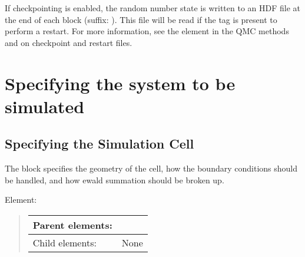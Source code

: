 \documentclass[letterpaper,10pt,english]{sphinxmanual}
\begin{document}
If checkpointing is enabled, the random number state is written to an HDF file at the end of each block (suffix: ).
This file will be read if the  tag is present to perform a restart.
For more information, see the  element in the QMC methods {\hyperref[\detokenize{methods:qmcmethods}]{}} and  on checkpoint and restart files.


\chapter{Specifying the system to be simulated}
\label{\detokenize{simulationcell:specifying-the-system-to-be-simulated}}\label{\detokenize{simulationcell:simulationcell}}\label{\detokenize{simulationcell::doc}}

\section{Specifying the Simulation Cell}
\label{\detokenize{simulationcell:specifying-the-simulation-cell}}
The  block specifies the geometry of the cell, how the boundary
conditions should be handled, and how ewald summation should be broken
up.

 Element:
\begin{quote}


\begin{savenotes}\sphinxattablestart
\centering
\begin{tabulary}{\linewidth}[t]{|T|T|}
\hline

Parent elements:
&
\\
\hline
Child elements:
&
None
\\
\hline
\end{tabulary}
\par
\sphinxattableend\end{savenotes}
\end{quote}
\end{document}
